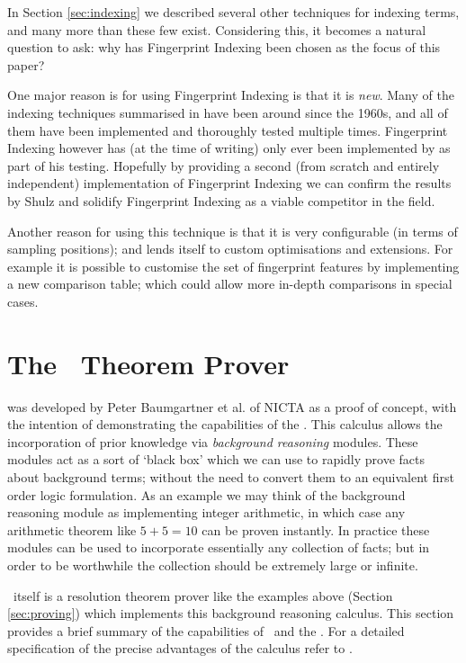 In Section \ref{sec:indexing} we described several other techniques for indexing
terms, and many more than these few exist. Considering this, it becomes a natural question to ask:
why has Fingerprint Indexing been chosen as the focus of this paper?

One major reason is for using Fingerprint Indexing is that it is \emph{new}. Many of the indexing
techniques summarised in \cite{indexing} have been around since the 1960s, and all of
them have been implemented and thoroughly tested multiple times. Fingerprint
Indexing however has (at the time of writing) only ever been implemented by 
as part of his testing. Hopefully by providing a second (from scratch and entirely independent)
implementation of Fingerprint Indexing we can confirm the results by Shulz and
solidify Fingerprint Indexing as a viable competitor in the field.

Another reason for using this technique is that it is very configurable (in terms
of sampling positions); and lends itself to custom optimisations and extensions.
For example it is possible to customise the set of fingerprint features by implementing a new comparison table;
which could allow more in-depth comparisons in special cases.

\section{The \Beagle\ Theorem Prover}
\label{sec:beagle}

{\Beagle} was developed by Peter Baumgartner et al. of NICTA as a proof of concept,
with the intention of demonstrating the capabilities of the \emph{\HSWAC} \cite{baum13}. This
calculus allows the incorporation of prior knowledge via \emph{background reasoning} modules. 
These modules act as a sort of `black box' which we can use to rapidly prove
facts about background terms; without the need to convert them to an equivalent first order logic
formulation. As an example we may think of the background reasoning module
as implementing integer arithmetic, in which case any arithmetic theorem like $5+5=10$ can be proven instantly.
In practice these modules can be used to
incorporate essentially any collection of facts; but in order to be worthwhile
the collection should be extremely large or infinite.

\Beagle\ itself is a resolution theorem prover like the examples above (Section \ref{sec:proving})
which implements this background reasoning calculus. This section provides a brief
summary of the capabilities of \beagle\ and the \HSWAC. For a detailed specification
of the precise advantages of the calculus refer to \cite{baum13}.

